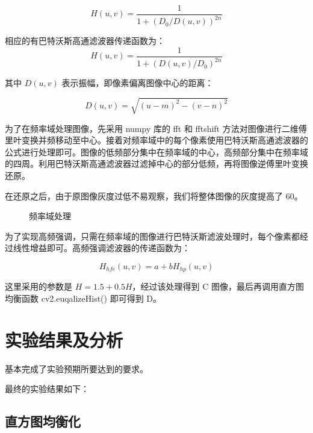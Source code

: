 \documentclass[11pt]{ctexart}
\begin{document}
$$
H(u, v) = \frac{1}{1 + (D_{0} / D(u, v))^{2n}}
$$

相应的有巴特沃斯高通滤波器传递函数为：
$$
H(u, v) = \frac{1}{1 + (D(u, v) / D_{0})^{2n}}
$$

其中 $D(u, v)$ 表示振幅，即像素偏离图像中心的距离：

$$
D(u, v) = \sqrt{(u - m)^2 - (v - n)^2}
$$

为了在频率域处理图像，先采用 numpy 库的 fft 和 fftshift 方法对图像进行二维傅里叶变换并频移动至中心。接着对频率域中的每个像素使用巴特沃斯高通滤波器的公式进行处理即可。图像的低频部分集中在频率域的中心，高频部分集中在频率域的四周。利用巴特沃斯高通滤波器过滤掉中心的部分低频，再将图像逆傅里叶变换还原。

在还原之后，由于原图像灰度过低不易观察，我们将整体图像的灰度提高了 60。

 \begin{figure}[htbp]
        \centering
        \caption{频率域处理}\label{fig:digit}
  \end{figure}

为了实现高频强调，只需在频率域的图像进行巴特沃斯滤波处理时，每个像素都经过线性增益即可。高频强调滤波器的传递函数为：

$$
H_{hfe}(u, v) = a + bH_{hp}(u, v)
$$


这里采用的参数是 $H = 1.5 + 0.5H$，经过该处理得到 C 图像，最后再调用直方图均衡函数 cv2.euqalizeHist() 即可得到 D。

\section{实验结果及分析}

基本完成了实验预期所要达到的要求。

最终的实验结果如下：

\subsection*{直方图均衡化}
\end{document}
